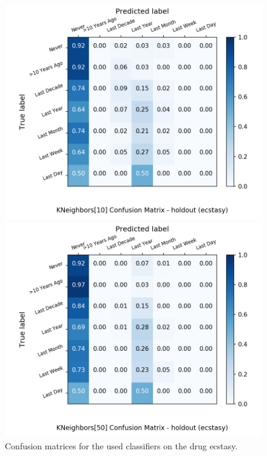 \begin{figure}[H]
\begin{minipage}[b]{0.32\textwidth}
		\includegraphics[width=1.1\textwidth]{Plots/ecstasy_KNeighbors_10_balance_False_holdout.png}
  \end{minipage}
	\begin{minipage}[b]{0.32\textwidth}
		\includegraphics[width=1.1\textwidth]{Plots/ecstasy_KNeighbors_50_balance_False_holdout.png}
  \end{minipage}
	\caption{Confusion matrices for the used classifiers on the drug ecstasy.}
\end{figure}

